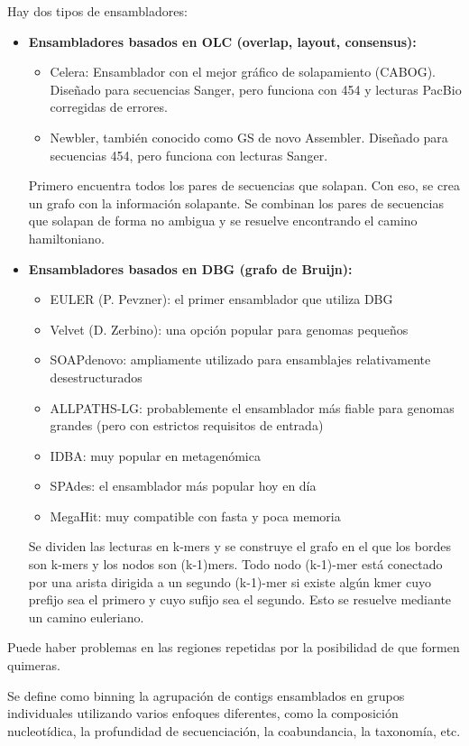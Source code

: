 Hay dos tipos de ensambladores:
\begin{itemize}
\item \textbf{Ensambladores basados en OLC (overlap, layout, consensus):}
\begin{itemize}
\item Celera: Ensamblador con el mejor gráfico de solapamiento (CABOG). Diseñado para secuencias Sanger, pero funciona con 454 y lecturas PacBio corregidas de errores. 
\item Newbler, también conocido como GS de novo Assembler. Diseñado para secuencias 454, pero funciona con lecturas Sanger.
\end{itemize}

Primero encuentra todos los pares de secuencias que solapan. Con eso, se crea un grafo con la información solapante. Se combinan los pares de secuencias que solapan de forma no ambigua y se resuelve encontrando el camino hamiltoniano.

\item \textbf{Ensambladores basados en DBG (grafo de Bruijn):}
\begin{itemize}
\item EULER (P. Pevzner): el primer ensamblador que utiliza DBG
\item Velvet (D. Zerbino): una opción popular para genomas pequeños
\item SOAPdenovo: ampliamente utilizado para ensamblajes relativamente desestructurados
\item ALLPATHS-LG: probablemente el ensamblador más fiable para genomas grandes (pero con estrictos requisitos de entrada)
\item IDBA: muy popular en metagenómica
\item SPAdes: el ensamblador más popular hoy en día
\item MegaHit: muy compatible con fasta y poca memoria
\end{itemize}

Se dividen las lecturas en k-mers y se construye el grafo en el que los bordes son k-mers y los nodos son (k-1)mers. Todo nodo (k-1)-mer está conectado por una arista dirigida a un segundo (k-1)-mer si existe algún kmer cuyo prefijo sea el primero y cuyo sufijo sea el segundo. Esto se resuelve mediante un camino euleriano. 
\end{itemize}

Puede haber problemas en las regiones repetidas por la posibilidad de que formen quimeras. 

Se define como binning la agrupación de contigs ensamblados en grupos individuales utilizando varios enfoques diferentes, como la composición nucleotídica, la profundidad de secuenciación, la coabundancia, la taxonomía, etc.

